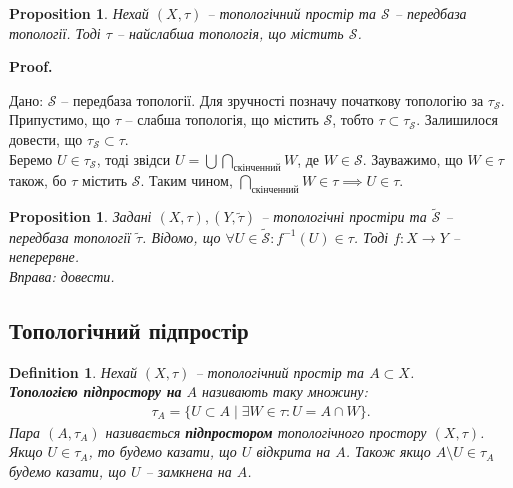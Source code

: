 \documentclass[a4paper, 10pt]{article}
\makeatletter
\theoremstyle{theoremdd}
\newtheorem{definition}[theorem]{Definition}
\newtheorem{example}[theorem]{Example}
\newtheorem{proposition}[theorem]{Proposition}
\renewenvironment{proof}[1][Proof.\\]{\par
\pushQED{\hfill \qed}%
\normalfont \topsep6\p@\@plus6\p@\relax
\trivlist
\item\relax
{\bfseries
#1\@addpunct{.}}\hspace\labelsep\ignorespaces
}{%
\popQED\endtrivlist\@endpefalse
}
\makeatother
\begin{document}
\begin{proposition}
Нехай $(X,\tau)$ -- топологічний простір та $\mathcal{S}$ -- передбаза топології. Тоді $\tau$ -- найслабша топологія, що містить $\mathcal{S}$.
\end{proposition}

\begin{proof}
Дано: $\mathcal{S}$ -- передбаза топології. Для зручності позначу початкову топологію за $\tau_{\mathcal{S}}$.\\
Припустимо, що $\tau$ -- слабша топологія, що містить $\mathcal{S}$, тобто $\tau \subset \tau_{\mathcal{S}}$. Залишилося довести, що $\tau_{\mathcal{S}} \subset \tau$.\\
Беремо $U \in \tau_{\mathcal{S}}$, тоді звідси $U = \displaystyle\bigcup \bigcap_{\text{скінченний}} W$, де $W \in \mathcal{S}$. Зауважимо, що $W \in \tau$ також, бо $\tau$ містить $\mathcal{S}$. Таким чином, $\displaystyle\bigcap_{\text{скінченний}} W \in \tau \implies U \in \tau$.
\end{proof}

\begin{proposition}
Задані $(X,\tau), (Y,\tilde{\tau})$ -- топологічні простіри та $\tilde{\mathcal{S}}$ -- передбаза топології $\tilde{\tau}$. Відомо, що $\forall U \in \tilde{\mathcal{S}}: f^{-1}(U) \in \tau$. Тоді $f \colon X \to Y$ -- неперервне.\\
\textit{Вправа: довести.}
\end{proposition}

\subsection{Топологічний підпростір}
\begin{definition}
Нехай $(X,\tau)$ -- топологічний простір та $A \subset X$.\\
\textbf{Топологією підпростору на} $A$ називають таку множину:
\begin{align*}
\tau_A = \{ U \subset A \mid \exists W \in \tau: U = A \cap W\}.
\end{align*}
Пара $(A,\tau_A)$ називається \textbf{підпростором} топологічного простору $(X,\tau)$.\\
Якщо $U \in \tau_A$, то будемо казати, що $U$ відкрита на $A$. Також якщо $A \setminus U \in \tau_A$ будемо казати, що $U$ -- замкнена на $A$.
\end{definition}
\end{document}
